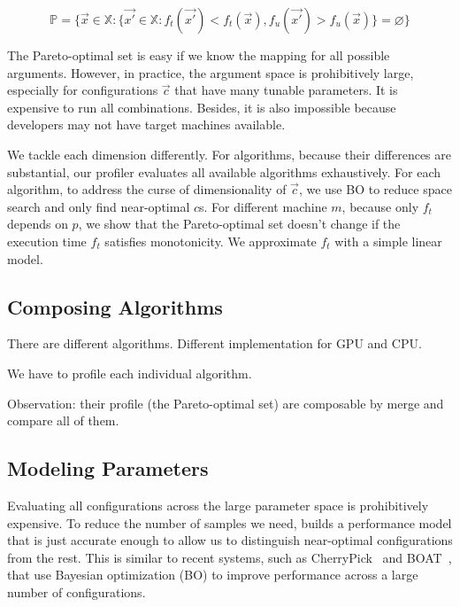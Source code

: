 {\small \vspace{-1.2em}
  \begin{equation}
    \mathbb{P} = \{ \vec{x} \in \mathbb{X} : \{ \vec{x'} \in \mathbb{X}:
    f_t(\vec{x'}) < f_t(\vec{x}), f_u(\vec{x'}) > f_u(\vec{x}) \} = \varnothing\}
  \label{eq:pareto}
\end{equation}
\vspace{-1.2em}
}

 The Pareto-optimal set is easy if we know the mapping for all
possible arguments. However, in practice, the argument space is prohibitively
large, especially for configurations $\vec{c}$ that have many tunable
parameters. It is expensive to run all combinations. Besides, it is also
impossible because developers may not have target machines available.

 We tackle each dimension differently. For algorithms,
because their differences are substantial, our profiler evaluates all available
algorithms exhaustively. For each algorithm, to address the curse of
dimensionality of $\vec{c}$, we use BO to reduce space search and only find
near-optimal $c$s. For different machine $m$, because only $f_t$ depends on $p$,
we show that the Pareto-optimal set doesn't change if the execution time $f_t$
satisfies monotonicity. We approximate $f_t$ with a simple linear model.

\subsection{Composing Algorithms}
\label{sec:compose-models}

There are different algorithms. Different implementation for GPU and CPU.

We have to profile each individual algorithm.

Observation: their profile (the Pareto-optimal set) are composable by merge and
compare all of them.

\subsection{Modeling Parameters}
\label{sec:single-platform}

Evaluating all configurations across the large parameter space is prohibitively
expensive. To reduce the number of samples we need, \sysname{} builds a
performance model that is just accurate enough to allow us to distinguish
near-optimal configurations from the rest. This is similar to recent systems,
such as CherryPick~\cite{alipourfard2017cherrypick} and
BOAT~\cite{dalibard2017boat}, that use Bayesian optimization (BO) to improve
performance across a large number of configurations.

